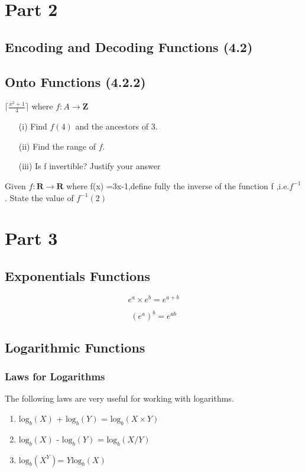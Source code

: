 \documentclass{article}
\begin{document}
\section{Part 2}


\subsection*{Encoding and Decoding Functions (4.2)}


\subsection*{Onto Functions (4.2.2)}




$\lceil \frac{x^2+1}{4} \rceil$
where $f : A \rightarrow \textbf{Z}$
\begin{itemize}
	\item[(i)] Find $f(4)$ and the ancestors of 3.
	\item[(ii)] Find the range of $f$.
	\item[(iii)] Is f invertible? Justify your answer
\end{itemize}

Given $f : \textbf{R} \rightarrow \textbf{R}$ where f(x) =3x-1,define fully
the inverse of the function f ,i.e.$f^{-1}$. 
State the value of $f^{-1}(2)$

\section{Part 3}
\subsection{Exponentials Functions}

\[ e^a \times e^b = e^{a+b}\]

\[ (e^a )^b = e^{ab}\]

\subsection{Logarithmic Functions}

\subsubsection{Laws for Logarithms}
The following laws are very useful for working with logarithms.
\begin{enumerate}
	\item $\mbox{log}_b(X)$ + $\mbox{log}_b(Y)$ = $\mbox{log}_b(X\times Y)$
	\item $\mbox{log}_b(X)$ - $\mbox{log}_b(Y)$ = $\mbox{log}_b(X / Y)$
	\item $\mbox{log}_b(X^Y)$= $Y \mbox{log}_b(X)$
\end{enumerate}
\end{document}
